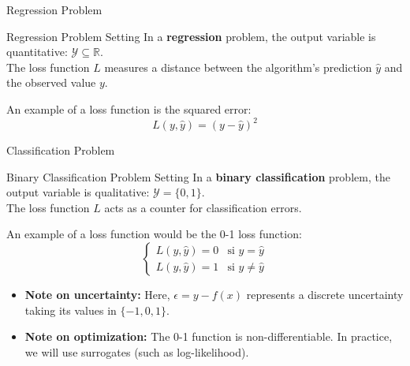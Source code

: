 \begin{frame}{Regression Problem}
	\begin{block}{Regression Problem Setting}
		In a \textbf{regression} problem, the output variable is quantitative: $\mathcal{Y} \subseteq \mathbb{R}$. \\
		\vspace{0.3cm}
		The loss function $L$ measures a distance between the algorithm's prediction $\hat{y}$ and the observed value $y$. 
	\end{block}
	\pause
	An example of a loss function is the squared error:
	\begin{equation}
		L(y, \hat{y}) = \left( y - \hat{y}\right)^2
		\nonumber
	\end{equation}
\end{frame}

\begin{frame}{Classification Problem}
	\begin{block}{Binary Classification Problem Setting}
		In a \textbf{binary classification} problem, the output variable is qualitative: $\mathcal{Y} = \{0, 1\}$. \\
		\vspace{0.3cm}
		The loss function $L$ acts as a counter for classification errors. \\
		\vspace{0.3cm}
	\end{block}
	\pause
	An example of a loss function would be the 0-1 loss function:
	\begin{equation}
		\begin{cases}
			L(y, \hat{y}) = 0 & \text{si } y = \hat{y} \\
			L(y, \hat{y}) = 1 & \text{si } y \ne \hat{y}
		\end{cases}
		\nonumber
	\end{equation}
	\pause
	\begin{itemize}
		\item \textbf{Note on uncertainty:} Here, $\epsilon = y - f(x)$ represents a discrete uncertainty taking its values in $\{-1, 0, 1\}$.
		\item \textbf{Note on optimization:} The 0-1 function is non-differentiable. In practice, we will use surrogates (such as log-likelihood).
	\end{itemize}
	
\end{frame}